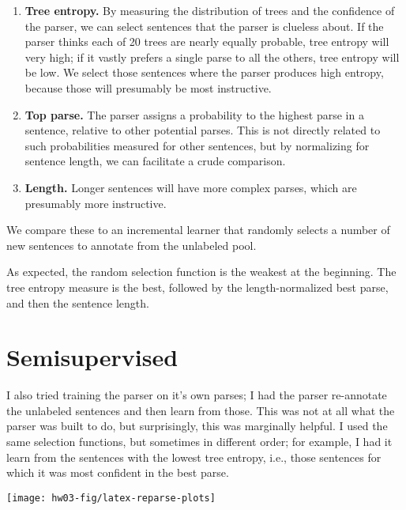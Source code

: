 \documentclass[10pt]{article}\usepackage{graphicx, color}
\newenvironment{knitrout}{}{} %
\begin{document}
\begin{enumerate}
  \item \textbf{Tree entropy.} By measuring the distribution of trees and the confidence of the parser, we can select sentences that the parser is clueless about. If the parser thinks each of 20 trees are nearly equally probable, tree entropy will very high; if it vastly prefers a single parse to all the others, tree entropy will be low. We select those sentences where the parser produces high entropy, because those will presumably be most instructive.
  \item \textbf{Top parse.} The parser assigns a probability to the highest parse in a sentence, relative to other potential parses. This is not directly related to such probabilities measured for other sentences, but by normalizing for sentence length, we can facilitate a crude comparison.
  \item \textbf{Length.} Longer sentences will have more complex parses, which are presumably more instructive.
\end{enumerate}

We compare these to an incremental learner that randomly selects a number of new sentences to annotate from the unlabeled pool.



As expected, the random selection function is the weakest at the beginning. The tree entropy measure is the best, followed by the length-normalized best parse, and then the sentence length.


\section{Semisupervised}

I also tried training the parser on it's own parses; I had the parser re-annotate the unlabeled sentences and then learn from those. This was not at all what the parser was built to do, but surprisingly, this was marginally helpful.
I used the same selection functions, but sometimes in different order; for example, I had it learn from the sentences with the lowest tree entropy, i.e., those sentences for which it was most confident in the best parse.

\begin{knitrout}\small
{}\color{fgcolor}

{\centering \texttt{[image: hw03-fig/latex-reparse-plots]} 

}



\end{knitrout}
\end{document}
